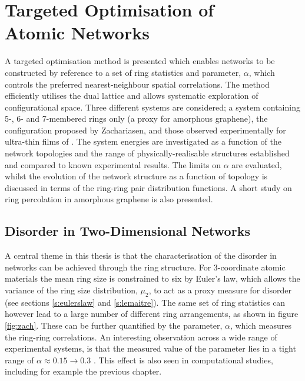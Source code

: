 \chapter[Targeted Optimisation of Atomic Networks]{Targeted Optimisation of \\ Atomic Networks}
\label{ch:targetedopt}

\begin{chapterabstract}
A targeted optimisation method is presented which enables \td{} networks to be constructed by reference to a set of ring statistics and \aw{} parameter, $\alpha$, which controls the preferred nearest\--neighbour spatial correlations.
The method efficiently utilises the dual lattice and allows systematic exploration of configurational space. 
Three different systems are considered; a system containing 5\--, 6\-- and 7\--membered rings only (a proxy for amorphous graphene), the configuration proposed by Zachariasen, and those
observed experimentally for ultra\--thin films of \sioii. 
The system energies are investigated as a function of the network topologies and the range of physically\--realisable structures established and compared to known experimental results.
The limits on $\alpha$ are evaluated, whilst the evolution of the network structure as a function of topology is discussed in terms of the ring\--ring pair distribution functions.
A short study on ring percolation in amorphous graphene is also presented.
\end{chapterabstract}


\section{Disorder in Two\--Dimensional Networks}

A central theme in this thesis is that the characterisation of the disorder in \td{} networks can be achieved through the ring structure. 
For 3\--coordinate atomic materials the mean ring size is constrained to six by Euler's law, which allows the variance of the ring size distribution, $\mu_2$, to act as a proxy measure for disorder (see sections \ref{s:eulerslaw} and \ref{s:lemaitre}).
The same set of ring statistics can however lead to a large number of different ring arrangements, as shown in figure \ref{fig:zach}.
These can be further quantified by the \aw{} parameter, $\alpha$, which measures the ring\--ring correlations.
An interesting observation across a wide range of experimental systems, is that the measured value of the \aw{} parameter lies in a tight range of $\alpha\approx0.15\rightarrow 0.3$ \cite{Zsoldos1999}.
This effect is also seen in computational studies, including for example the previous chapter.

